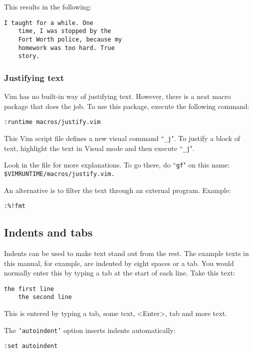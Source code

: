 This results in the following:

\begin{Verbatim}[samepage=true]
         I taught for a while. One
    time, I was stopped by the
    Fort Worth police, because my
    homework was too hard. True
    story.
\end{Verbatim}

\subsubsection{Justifying text}
Vim has no built-in way of justifying text.
However, there is a neat macro package that does the job.
To use this package, execute the following command:

\begin{Verbatim}[samepage=true]
 :runtime macros/justify.vim
\end{Verbatim}

This Vim script file defines a new visual command ``\texttt{\_j}".
To justify a block of text, highlight the text in Visual mode and then execute ``\texttt{\_j}".

Look in the file for more explanations.
To go there, do ``\texttt{gf}" on this name:\\ \texttt{\$VIMRUNTIME/macros/justify.vim.}

An alternative is to filter the text through an external program.
Example:

\begin{Verbatim}[samepage=true]
 :%!fmt
\end{Verbatim}
\subsection{Indents and tabs}
\label{Indents and tabs}
Indents can be used to make text stand out from the rest.  The example texts
in this manual, for example, are indented by eight spaces or a tab.  You would
normally enter this by typing a tab at the start of each line.  Take this
text:

\begin{Verbatim}[samepage=true]
    the first line
    the second line
\end{Verbatim}

This is entered by typing a tab, some text, <Enter>, tab and more text.

The \texttt{'autoindent'} option inserts indents automatically:

\begin{Verbatim}[samepage=true]
 :set autoindent
\end{Verbatim}

